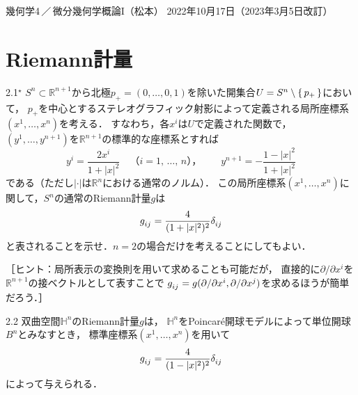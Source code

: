 \documentclass[uplatex,dvipdfmx,fontsize=12pt,jafontsize=11pt,line_length=42zw,number_of_lines=36,hanging_punctuation]{jlreq}
\newcommand{\abs}[1]{\lvert#1\rvert}
\begin{document}
\begin{flushleft}
	幾何学4\,／\,微分幾何学概論I（松本）
	\hfill
	2022年10月17日（2023年3月5日改訂）
\end{flushleft}
\setcounter{section}{1}
\section{Riemann計量}

\begin{problems}
	\item[2.1$^\star$]
		$S^n\subset\mathbb{R}^{n+1}$から北極$p_+=(0,\dotsc,0,1)$を除いた開集合$U=S^n\setminus\set{p_+}$において，
		$p_+$を中心とするステレオグラフィック射影によって定義される局所座標系$(x^1,\dots,x^n)$を考える．
		すなわち，各$x^i$は$U$で定義された関数で，
		$(y^1,\dots,y^{n+1})$を$\mathbb{R}^{n+1}$の標準的な座標系とすれば
		\begin{equation}
			y^i=\frac{2x^i}{1+\abs{x}^2}\quad\text{（$i=1$, $\dots$, $n$），}\qquad
			y^{n+1}=-\frac{1-\abs{x}^2}{1+\abs{x}^2}
		\end{equation}
		である（ただし$\abs{\cdot}$は$\mathbb{R}^n$における通常のノルム）．
		この局所座標系$(x^1,\dots,x^n)$に関して，$S^n$の通常のRiemann計量$g$は
		\begin{equation}
			\tensor{g}{_i_j}=\frac{4}{(1+\abs{x}^2)^2}\tensor{\delta}{_i_j}
		\end{equation}
		と表されることを示せ．$n=2$の場合だけを考えることにしてもよい．

		［ヒント：局所表示の変換則を用いて求めることも可能だが，
		直接的に$\partial/\partial x^i$を$\mathbb{R}^{n+1}$の接ベクトルとして表すことで
		$\tensor{g}{_i_j}=g(\partial/\partial x^i,\partial/\partial x^j)$を求めるほうが簡単だろう．］
	\item[2.2]
		双曲空間$\mathbb{H}^n$のRiemann計量$g$は，
		$\mathbb{H}^n$をPoincar\'e開球モデルによって単位開球$B^n$とみなすとき，
		標準座標系$(x^1,\dots,x^n)$を用いて
		\begin{equation}
			\tensor{g}{_i_j}=\frac{4}{(1-\abs{x}^2)^2}\tensor{\delta}{_i_j}
		\end{equation}
		によって与えられる．


\end{problems}
\end{document}
